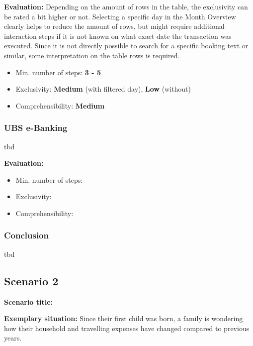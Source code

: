 \textbf{Evaluation:} Depending on the amount of rows in the table, the exclusivity can be rated a bit higher or not. Selecting a specific day in the Month Overview clearly helps to reduce the amount of rows, but might require additional interaction steps if it is not known on what exact date the transaction was executed. Since it is not directly possible to search for a specific booking text or similar, some interpretation on the table rows is required.
\begin{itemize}[noitemsep,nolistsep]
	\item Min. number of steps: \textbf{3 - 5}
	\item Exclusivity: \textbf{Medium} (with filtered day), \textbf{Low} (without)
	\item Comprehensibility: \textbf{Medium}
\end{itemize}



\subsubsection{UBS e-Banking}

tbd

\textbf{Evaluation:} 
\begin{itemize}[noitemsep,nolistsep]
	\item Min. number of steps: \textbf{}
	\item Exclusivity: \textbf{}
	\item Comprehensibility: \textbf{}
\end{itemize}


\subsubsection{Conclusion}

tbd



\subsection{Scenario 2}

\textbf{Scenario title:} \scentwo

\textbf{Exemplary situation:} Since their first child was born, a family is wondering how their household and travelling expenses have changed compared to previous years.




